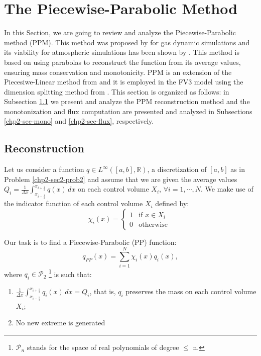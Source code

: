 \section{The Piecewise-Parabolic Method}
\label{chp2-sec-ppm}
In this Section, we are going to review and analyze the Piecewise-Parabolic method (PPM).
This method was proposed by \citet{colella:1984} for gas dynamic simulations and
its viability for atmospheric simulations has been shown by \citet{carpenter:1990}.
This method is based on using parabolas to reconstruct the function from its 
average values, ensuring mass conservation and monotonicity.
PPM is an extension of the Piecesiwe-Linear method from \citet{vanleer:1977}
and it is employed in the FV3 model using the dimension splitting method from \citet{lin:1996}.
This section is organized as follows: in Subsection \ref{chp2-sec-recon} 
we present and analyze the PPM reconstruction method and the monotonization and 
flux computation are presented and analyzed in Subsections 
\ref{chp2-sec-mono} and \ref{chp2-sec-flux}, respectively.


\subsection{Reconstruction}
\label{chp2-sec-recon}
Let us consider a function ${q} \in L^{\infty}([a, b],\mathbb{R})$, a discretization of
$[a,b]$ as in Problem \ref{chp2-sec2-prob2}
and assume that we are given the average values ${Q}_i = \frac{1}{\Delta x} 
\int_{x_{i-\frac{1}{2}}}^{x_{i+\frac{1}{2}}} {q}(x) \,dx$
on each control volume $X_i$, $\forall i = 1, \cdots, N $.
We make use of the indicator function of each control volume $X_i$ defined by:
\begin{equation*}
	\label{chp2-sec3-1-eq1}
	\chi_{i}(x)=
	\begin{cases}
		1 & \text{if } x \in X_i\\
		0 & \text{otherwise }
	\end{cases}
\end{equation*}

Our task is to find a Piecewise-Parabolic (PP) function:
\begin{equation}
	\label{chp2-sec3-1-eq2}
	q_{PP}(x) = \sum_{i=1}^{N} \chi_i(x) q_i(x),
\end{equation}
where ${q}_i \in \mathcal{P}_2$
\footnote{$\mathcal{P}_n$ stands for the space of real polynomials of degree $\leq$ n.} 
is such that:
\begin{enumerate}
	\item $\frac{1}{\Delta x}\int_{x_{i-\frac{1}{2}}}^{x_{i+\frac{1}{2}}} {q}_i(x) \,dx = {Q}_i$,
	that is, $q_i$ preserves the mass on each control volume $X_i$;
	\item No new extreme is generated%
\end{enumerate}

